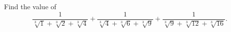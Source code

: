 Find the value of
\[
\dfrac{1}{\sqrt[3]{1}+\sqrt[3]{2}+\sqrt[3]{4}}+\dfrac{1}{\sqrt[3]{4}+\sqrt[3]{6}+\sqrt[3]{9}}+\dfrac{1}{\sqrt[3]{9}+\sqrt[3]{12}+\sqrt[3]{16}} .
\]
